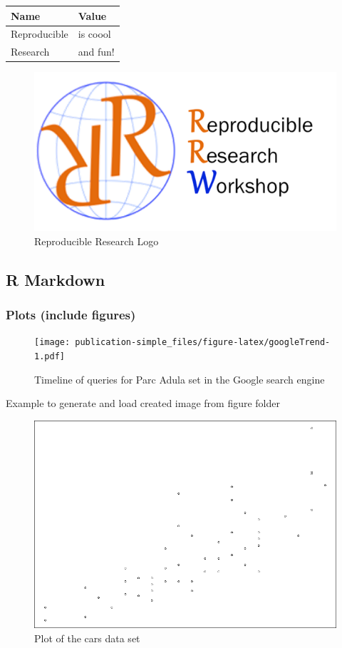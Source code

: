 \documentclass[]{article}
\begin{document}
\begin{longtable}[c]{@{}ll@{}}
\toprule
Name & Value\tabularnewline
\midrule
\endhead
Reproducible & is coool\tabularnewline
Research & and fun!\tabularnewline
\bottomrule
\end{longtable}

\begin{figure}[htbp]
\centering
\includegraphics{figures/logo.png}
\caption{Reproducible Research Logo}
\end{figure}

\subsection{R Markdown}\label{r-markdown}

\subsubsection{Plots (include figures)}\label{plots-include-figures}

\begin{figure}[htbp]
\centering
\texttt{[image: publication-simple\_files/figure-latex/googleTrend-1.pdf]}
\caption{Timeline of queries for Parc Adula set in the Google search
engine}
\end{figure}

Example to generate and load created image from figure folder

\begin{figure}
\includegraphics[width=0.8\linewidth]{figures/plot} \caption{Plot of the cars data set}\label{fig:map}
\end{figure}
\end{document}

